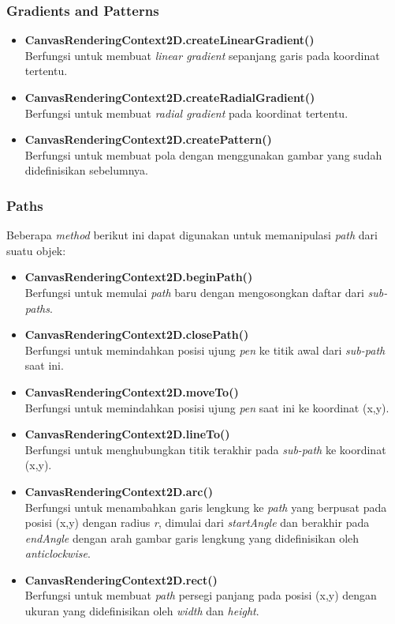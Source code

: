 \subsubsection{Gradients and Patterns}

\begin{itemize}
	\item \textbf{CanvasRenderingContext2D.createLinearGradient()} \\ Berfungsi untuk membuat \textit{linear gradient} sepanjang garis pada koordinat tertentu.
	\item \textbf{CanvasRenderingContext2D.createRadialGradient()} \\ Berfungsi untuk membuat \textit{radial gradient} pada koordinat tertentu.
	\item \textbf{CanvasRenderingContext2D.createPattern()} \\ Berfungsi untuk membuat pola dengan menggunakan gambar yang sudah didefinisikan sebelumnya.
\end{itemize}

\subsubsection{Paths}
Beberapa \textit{method} berikut ini dapat digunakan untuk memanipulasi \textit{path} dari suatu objek:

\begin{itemize}
	\item \textbf{CanvasRenderingContext2D.beginPath()} \\ Berfungsi untuk memulai \textit{path} baru dengan mengosongkan daftar dari \textit{sub-paths}.
	\item \textbf{CanvasRenderingContext2D.closePath()} \\ Berfungsi untuk memindahkan posisi ujung \textit{pen} ke titik awal dari \textit{sub-path} saat ini.
	\item \textbf{CanvasRenderingContext2D.moveTo()} \\ Berfungsi untuk memindahkan posisi ujung \textit{pen} saat ini ke koordinat (x,y).
	\item \textbf{CanvasRenderingContext2D.lineTo()} \\ Berfungsi untuk menghubungkan titik terakhir pada \textit{sub-path} ke koordinat (x,y).
	\item \textbf{CanvasRenderingContext2D.arc()} \\ Berfungsi untuk menambahkan garis lengkung ke \textit{path} yang berpusat pada posisi (x,y) dengan radius \textit{r}, dimulai dari \textit{startAngle} dan berakhir pada \textit{endAngle} dengan arah gambar garis lengkung yang didefinisikan oleh \textit{anticlockwise}.
	\item \textbf{CanvasRenderingContext2D.rect()} \\ Berfungsi untuk membuat \textit{path} persegi panjang pada posisi (x,y) dengan ukuran yang didefinisikan oleh \textit{width} dan \textit{height}.
\end{itemize}




